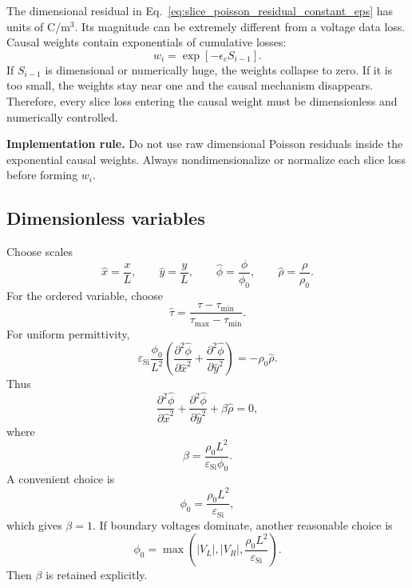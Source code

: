 \documentclass[11pt]{article}
\newcommand{\epss}{\varepsilon_{\mathrm{Si}}}
\newcommand{\taud}{\tau}
\begin{document}
The dimensional residual in Eq.~\eqref{eq:slice_poisson_residual_constant_eps} has units of C/m$^3$. Its magnitude can be extremely different from a voltage data loss. Causal weights contain exponentials of cumulative losses:
\begin{equation}
w_i=\exp\left[-\epsilon_c S_{i-1}\right].
\end{equation}
If $S_{i-1}$ is dimensional or numerically huge, the weights collapse to zero. If it is too small, the weights stay near one and the causal mechanism disappears. Therefore, every slice loss entering the causal weight must be dimensionless and numerically controlled.

\begin{notebox}
\textbf{Implementation rule.} Do not use raw dimensional Poisson residuals inside the exponential causal weights. Always nondimensionalize or normalize each slice loss before forming $w_i$.
\end{notebox}

\subsection{Dimensionless variables}

Choose scales
\begin{equation}
\hat{x}=\frac{x}{L},\qquad
\hat{y}=\frac{y}{L},\qquad
\hat{\phi}=\frac{\phi}{\phi_0},\qquad
\hat{\rho}=\frac{\rho}{\rho_0}.
\end{equation}
For the ordered variable, choose
\begin{equation}
\hat{\taud}=\frac{\taud-\taud_{\min}}{\taud_{\max}-\taud_{\min}}.
\end{equation}
For uniform permittivity,
\begin{equation}
\epss\frac{\phi_0}{L^2}
\left(\frac{\partial^2\hat{\phi}}{\partial\hat{x}^2}
+\frac{\partial^2\hat{\phi}}{\partial\hat{y}^2}\right)
=-\rho_0\hat{\rho}.
\end{equation}
Thus
\begin{equation}
\frac{\partial^2\hat{\phi}}{\partial\hat{x}^2}
+\frac{\partial^2\hat{\phi}}{\partial\hat{y}^2}
+\beta\hat{\rho}=0,
\label{eq:dimensionless_poisson_cpinn}
\end{equation}
where
\begin{equation}
\beta=\frac{\rho_0L^2}{\epss\phi_0}.
\end{equation}
A convenient choice is
\begin{equation}
\phi_0=\frac{\rho_0L^2}{\epss},
\end{equation}
which gives $\beta=1$. If boundary voltages dominate, another reasonable choice is
\begin{equation}
\phi_0=\max\left(|V_L|,|V_R|,\frac{\rho_0L^2}{\epss}\right).
\end{equation}
Then $\beta$ is retained explicitly.
\end{document}

